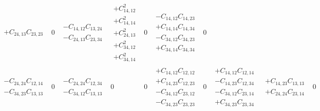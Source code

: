 \documentclass[pra,nofootinbib]{revtex4-1}
\newcommand{\C}[2]{C_{{#1},{#2}}}
\begin{document}
\begin{eqnarray}
\begin{array}{cccccccccccccccc}
\begin{array}{c}
     + \C{24}{13}\C{23}{23} 
     \end{array} &
     0 &
     \begin{array}{c}
     - \C{14}{12}\C{13}{24} \\
     - \C{24}{13}\C{23}{34} 
     \end{array} &
     \begin{array}{c}
     + \C{14}{12}^2 \\
     + \C{14}{14}^2 \\
     + \C{24}{13}^2 \\
     + \C{34}{12}^2 \\
     + \C{34}{14}^2 
     \end{array} &
     0 &
     \begin{array}{c}
     - \C{14}{12}\C{14}{23} \\
     + \C{14}{14}\C{14}{34} \\
     - \C{34}{12}\C{34}{23} \\
     + \C{34}{14}\C{34}{34} 
     \end{array} &
     0 \\
     \begin{array}{c}
     - \C{24}{24}\C{12}{14} \\
     - \C{34}{23}\C{13}{13} 
     \end{array} &
     0 &
     \begin{array}{c}
     - \C{24}{24}\C{12}{34} \\
     - \C{34}{12}\C{13}{13} 
     \end{array} &
     0 &
     0 &
     \begin{array}{c}
     + \C{14}{12}\C{12}{12} \\
     + \C{14}{23}\C{12}{23} \\
     - \C{34}{12}\C{23}{12} \\
     - \C{34}{23}\C{23}{23} 
     \end{array} &
     0 &
     \begin{array}{c}
     + \C{14}{12}\C{12}{14} \\
     - \C{14}{23}\C{12}{34} \\
     - \C{34}{12}\C{23}{14} \\
     + \C{34}{23}\C{23}{34} 
     \end{array} &
     \begin{array}{c}
     + \C{14}{23}\C{13}{13} \\
     + \C{24}{24}\C{23}{14} 
     \end{array} &
     0 &
     \begin{array}{c}

\end{array}
\end{array}
\end{eqnarray}
\end{document}
